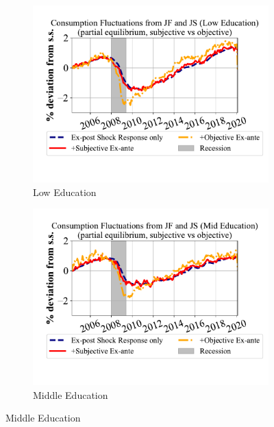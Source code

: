   \begin{figure}[ht]
    \centering
    \caption{\textbf{Monthly} Consumption Fluctuations due to Unemployment Risks: by Education}
    \label{fig:pe_decompose_sub_obj_educ_monthly}

    \begin{subfigure}{0.32\linewidth}
     \caption*{Low Education}
        \includegraphics[width=\linewidth]{text/Chapter2/Figures/consumption_pe_JS_JF_deviation_machine_as_rational_LowEdu_monthly.pdf}
       
    \end{subfigure}
    \hfill
    \begin{subfigure}{0.32\linewidth}
     \caption*{Middle Education}
        \includegraphics[width=\linewidth]{text/Chapter2/Figures/consumption_pe_JS_JF_deviation_machine_as_rational_MidEdu_monthly.pdf}
       

\end{subfigure}
\end{figure}
